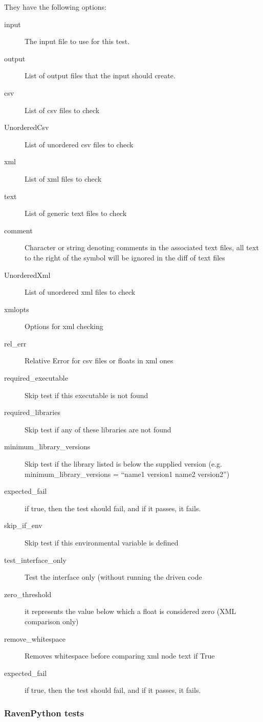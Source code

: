 \documentclass{article}
\begin{document}
They have the following options:

\begin{description}
    \item[input] The input file to use for this test.
    \item[output] List of output files that the input should create.
    \item[csv] List of csv files to check
    \item[UnorderedCsv] List of unordered csv files to check
    \item[xml] List of xml files to check
    \item[text] List of generic text files to check
    \item[comment] Character or string denoting comments in the associated text files, all text to the right of the symbol will be ignored in the diff of text files
    \item[UnorderedXml] List of unordered xml files to check
    \item[xmlopts] Options for xml checking
    \item[rel\_err] Relative Error for csv files or floats in xml ones
    \item[required\_executable] Skip test if this executable is not found
    \item[required\_libraries] Skip test if any of these libraries are not found
    \item[minimum\_library\_versions] Skip test if the library listed is below the supplied version (e.g. minimum\_library\_versions = ``name1 version1 name2 version2'')
    \item[expected\_fail] if true, then the test should fail, and if it passes, it fails.
    \item[skip\_if\_env] Skip test if this environmental variable is defined
    \item[test\_interface\_only] Test the interface only (without running the driven code
    \item[zero\_threshold] it represents the value below which a float is considered zero (XML comparison only)
    \item[remove\_whitespace] Removes whitespace before comparing xml node text if True
    \item[expected\_fail] if true, then the test should fail, and if it passes, it fails.
\end{description}

\subsubsection{RavenPython tests}
\end{document}
